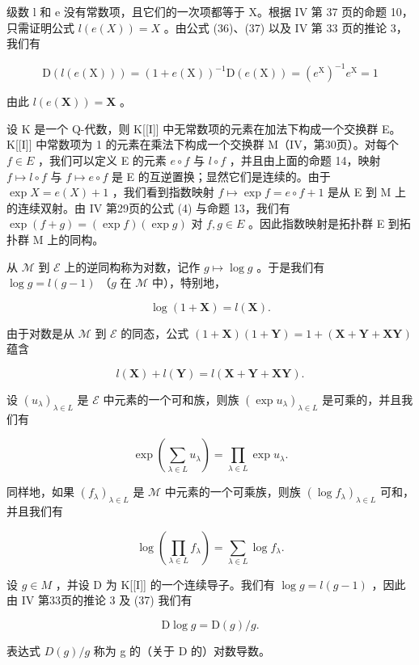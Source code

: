 级数 l 和 e 没有常数项，且它们的一次项都等于 X。根据 IV 第 37 页的命题 10，只需证明公式 \(l(e(X)) = X\) 。由公式 (36)、(37) 以及 IV 第 33 页的推论 3，我们有

\[
\mathrm{D} (l (e (\mathrm{X}))) = (1 + e (\mathrm{X})) ^ {- 1} \mathrm{D} (e (\mathrm{X})) = (e ^ {\mathrm{X}}) ^ {- 1} e ^ {\mathrm{X}} = 1
\]

由此 \(l(e(\mathbf{X})) = \mathbf{X}\) 。

设 K 是一个 Q-代数，则 K{[}{[}I{]}{]} 中无常数项的元素在加法下构成一个交换群 E。K{[}{[}I{]}{]} 中常数项为 1 的元素在乘法下构成一个交换群 M（IV，第30页）。对每个 \(f \in E\) ，我们可以定义 E 的元素 \(e \circ f\) 与 \(l \circ f\) ，并且由上面的命题 14，映射 \(f \mapsto l \circ f\) 与 \(f \mapsto e \circ f\) 是 E 的互逆置换；显然它们是连续的。由于 \(\exp X = e(X) + 1\) ，我们看到指数映射 \(f \mapsto \exp f = e \circ f + 1\) 是从 E 到 M 上的连续双射。由 IV 第29页的公式 (4) 与命题 13，我们有 \(\exp(f + g) = (\exp f)(\exp g)\) 对 \(f, g \in E\) 。因此指数映射是拓扑群 E 到拓扑群 M 上的同构。

从 \(\mathcal{M}\) 到 \(\mathcal{E}\) 上的逆同构称为对数，记作 \(g \mapsto \log g\) 。于是我们有 \(\log g = l(g - 1)\) （\(g\) 在 \(\mathcal{M}\) 中），特别地，

\[
\log (1 + \mathbf {X}) = l (\mathbf {X}).\tag{38}
\]

由于对数是从 \(\mathcal{M}\) 到 \(\mathcal{E}\) 的同态，公式 \((1 + \mathbf{X})(1 + \mathbf{Y}) = 1 + (\mathbf{X} + \mathbf{Y} + \mathbf{X}\mathbf{Y})\) 蕴含

\[
l (\mathbf {X}) + l (\mathbf {Y}) = l (\mathbf {X} + \mathbf {Y} + \mathbf {X Y}).\tag{39}
\]

设 \((u_{\lambda})_{\lambda \in L}\) 是 \(\mathcal{E}\) 中元素的一个可和族，则族 \((\exp u_{\lambda})_{\lambda \in L}\) 是可乘的，并且我们有

\[
\exp \left(\sum_ {\lambda \in L} u _ {\lambda}\right) = \prod_ {\lambda \in L} \exp u _ {\lambda}.\tag{40}
\]

同样地，如果 \((f_{\lambda})_{\lambda \in L}\) 是 \(\mathcal{M}\) 中元素的一个可乘族，则族 \((\log f_{\lambda})_{\lambda \in L}\) 可和，并且我们有

\[
\log \left(\prod_ {\lambda \in L} f _ {\lambda}\right) = \sum_ {\lambda \in L} \log f _ {\lambda}.\tag{41}
\]

设 \(g \in M\) ，并设 D 为 K{[}{[}I{]}{]} 的一个连续导子。我们有 \(\log g = l(g - 1)\) ，因此由 IV 第33页的推论 3 及 (37) 我们有

\[
\mathrm{D} \log g = \mathrm{D} (g) / g.\tag{42}
\]

表达式 \(D(g)/g\) 称为 g 的（关于 D 的）对数导数。

